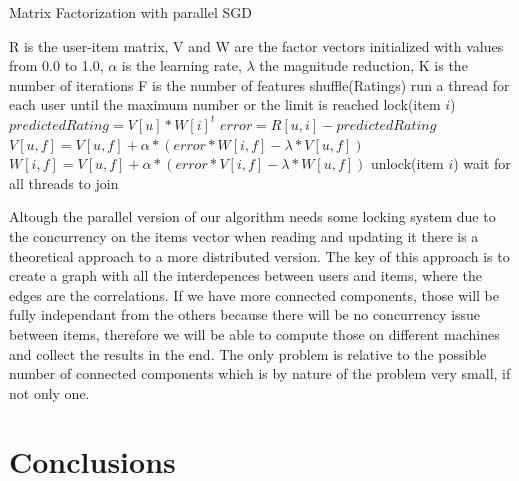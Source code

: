 \documentclass{sig-alternate-05-2015}
\begin{document}
\begin{algorithm}
    \caption{Matrix Factorization with parallel SGD}

    \begin{algorithmic}[1]
        \Require
            \Statex R is the user-item matrix,
            \Statex V and W are the factor vectors initialized with values from 0.0 to 1.0,
            \Statex $\alpha$ is the learning rate,
            \Statex $\lambda$ the magnitude reduction,
            \Statex K is the number of iterations
            \Statex F is the number of features
    \State shuffle(Ratings)
        \State run a thread for each user until the maximum number or the limit is reached
                \State lock(item $i$)
                \State $predictedRating = V[u] * W[i]^{t}$
                \State $error = R[u,i] - predictedRating$
                        \State $V[u,f] = V[u,f] + \alpha * (error * W[i,f] - \lambda * V[u,f])$
                        \State $W[i,f] = V[u,f] + \alpha * (error * V[i,f] - \lambda * W[u,f])$
                    \EndFor
                \State unlock(item $i$)
            \EndFor
        \EndFor
    \State wait for all threads to join
    \EndFor
    \end{algorithmic}
\end{algorithm}

Altough the parallel version of our algorithm needs some locking system
due to the concurrency on the items vector when reading and updating it
there is a theoretical approach to a more distributed version. The key
of this approach is to create a graph with all the interdepences between
users and items, where the edges are the correlations. If we have
more connected components, those will be fully independant from the others
because there will be no concurrency issue between items, therefore we
will be able to compute those on different machines and collect the results in the end.
The only problem is relative to the possible number of connected components which
is by nature of the problem very small, if not only one.




\section{Conclusions}
\end{document}
